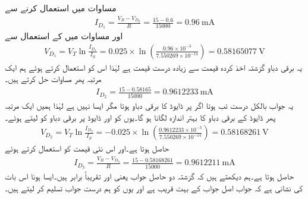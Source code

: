 مساوات   میں  استعمال کرنے سے
\begin{align*}
I_{D_1}=\frac{V_B-V_{D_0}}{R}=\frac{15-0.6}{15000}=\SI{0.96}{\milli \ampere}
\end{align*}
اور مساوات   میں  کے استعمال سے
\begin{align*}
V_{D_1}=V_T \ln \frac{I_{D_1}}{I_S}=0.025 \times \ln \left (\frac{0.96 \times 10^{-3}}{7.550269 \times 10^{-14}} \right )=\SI{0.58165077}{\volt}
\end{align*}
یہ برقی دباو گزشتہ اخذ کردہ قیمت سے زیادہ درست قیمت ہے لہٰذا اس کو استعمال کرتے ہوئے ہم ایک مرتبہ پھر مساوات  حل کرتے ہیں۔
\begin{align*}
I_{D_2}=\frac{15-0.58165}{15000}=\SI{0.9612233}{\milli \ampere}
\end{align*}
یہ جواب بالکل درست تب ہوتا اگر  پر ڈایوڈ کا برقی دباو  ہوتا مگر ایسا نہیں ہے لہٰذا ہمیں ایک مرتبہ پھر ڈایوڈ کے برقی دباو کا بہتر اندازہ لگانا ہو گا۔یوں  کو  اور  ڈایوڈ پر برقی دباو کو  لیتے ہوئے۔
\begin{align*}
V_{D_2}=V_T \ln \frac{I_{D_2}}{I_S}=-0.025 \times \ln \left ( \frac{0.9612233 \times 10^{-3}}{7.550269 \times 10^{-14}} \right )=\SI{0.58168261}{\volt}
\end{align*}
حاصل ہوتا ہے۔اور اس نئی قیمت کو استعمال کرتے ہوئے
\begin{align*}
I_{D_3}=\frac{V_B-V_{D_2}}{R}=\frac{15-0.58168261}{15000}=\SI{0.9612211}{\milli \ampere}
\end{align*}
حاصل ہوتا ہے۔ہم دیکھتے ہیں کہ گزشتہ دو حاصل جواب یعنی  اور  تقریباً برابر ہیں۔ایسا ہونا اس بات کی نشانی ہے کہ جواب اصل جواب کے بہت قریب ہے اور یوں  کو ہم درست جواب تسلیم کر لیتے ہیں۔



